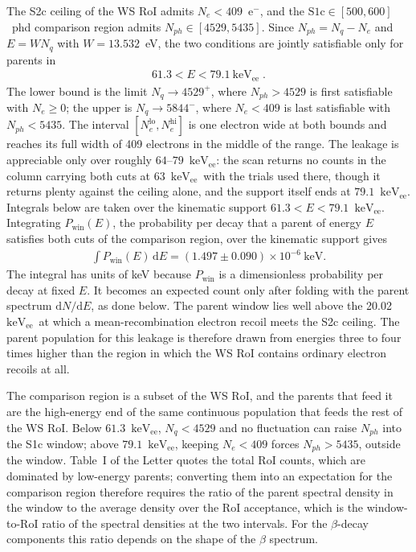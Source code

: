 \documentclass[11pt,a4paper]{article}
\newcommand{\keVee}{\ensuremath{\mathrm{keV_{ee}}}}
\begin{document}
The S2c ceiling of the WS RoI admits \(N_e<409\)~e\(^-\), and the
\(\mathrm{S1c}\in[500,600]\)~phd comparison region admits
\(N_{ph}\in[4529,5435]\). Since \(N_{ph}=N_q-N_e\) and
\(E=W N_q\) with \(W=13.532\)~eV, the two conditions are jointly
satisfiable only for parents in
\begin{align}
    61.3 < E < 79.1~\mathrm{keV}_\mathrm{ee}\;.
\end{align}
The lower bound is the limit \(N_q\to4529^{+}\), where
\(N_{ph}>4529\) is first satisfiable with \(N_e\geq0\); the upper is
\(N_q\to5844^{-}\), where \(N_e<409\) is last satisfiable with
\(N_{ph}<5435\). The interval \([N_e^\mathrm{lo},N_e^\mathrm{hi}]\) is one
electron wide at both bounds and reaches its full width of 409 electrons
in the middle of the range. The leakage is appreciable only over roughly
\(64\)--\(79\)~\keVee: the scan returns no counts in the column carrying
both cuts at \(63\)~\keVee\ with the trials used there, though it
returns plenty against the ceiling alone, and the support itself ends at
\(79.1\)~\keVee. Integrals below are taken over the kinematic support
\(61.3 < E < 79.1\)~\keVee. Integrating \(P_\mathrm{win}(E)\), the
probability per decay that a parent of energy \(E\) satisfies both cuts
of the comparison region, over the kinematic support gives 
\begin{align} 
	\int P_\mathrm{win}(E)\,\mathrm{d}E = (1.497 \pm 0.090) \times
10^{-6}~\mathrm{keV}. 
\end{align} 
The integral has units of keV because \(P_\mathrm{win}\) is a
dimensionless probability per decay at fixed \(E\). It becomes an
expected count only after folding with the parent spectrum
\(\mathrm{d}N/\mathrm{d}E\), as done below. The parent window lies well
above the 20.02~\keVee\ at which a mean-recombination electron recoil
meets the S2c ceiling. The parent population for this leakage is
therefore drawn from energies three to four times higher than the region
in which the WS RoI contains ordinary electron recoils at all.


The comparison region is a subset of the WS RoI, and the parents that feed
it are the high-energy end of the same continuous population that feeds
the rest of the WS RoI. Below \(61.3\)~\keVee, \(N_q <
4529\) and no fluctuation can raise \(N_{ph}\) into the S1c window;
above \(79.1\)~\keVee, keeping \(N_e < 409\) forces \(N_{ph} >
5435\), outside the window. Table~I of the Letter quotes the total RoI counts, which are
dominated by low-energy parents; converting them into an expectation for
the comparison region therefore requires the ratio of the parent
spectral density in the window to the average density over the RoI
acceptance, which is the window-to-RoI ratio of the spectral densities at the two intervals. For the
\(\beta\)-decay components this ratio depends on the shape of the
\(\beta\) spectrum.
\end{document}
